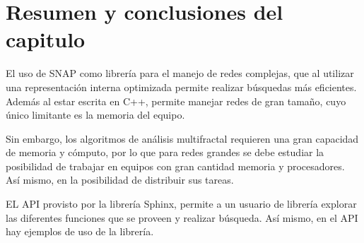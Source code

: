 \section{Resumen y conclusiones del capitulo}

El uso de SNAP como librería para el manejo de redes complejas, que al utilizar una representación interna optimizada permite realizar búsquedas más eficientes. Además al estar escrita en C++, permite manejar redes de gran tamaño, cuyo único limitante es la memoria del equipo.

Sin embargo, los algoritmos de análisis multifractal requieren una gran capacidad de memoria y cómputo, por lo que para redes grandes se debe estudiar la posibilidad de trabajar en equipos con gran cantidad memoria y procesadores. Así mismo, en la posibilidad de distribuir sus tareas.

EL API provisto por la librería Sphinx, permite a un usuario de librería explorar las diferentes funciones que se proveen y realizar búsqueda. Así mismo, en el API hay ejemplos de uso de la librería.